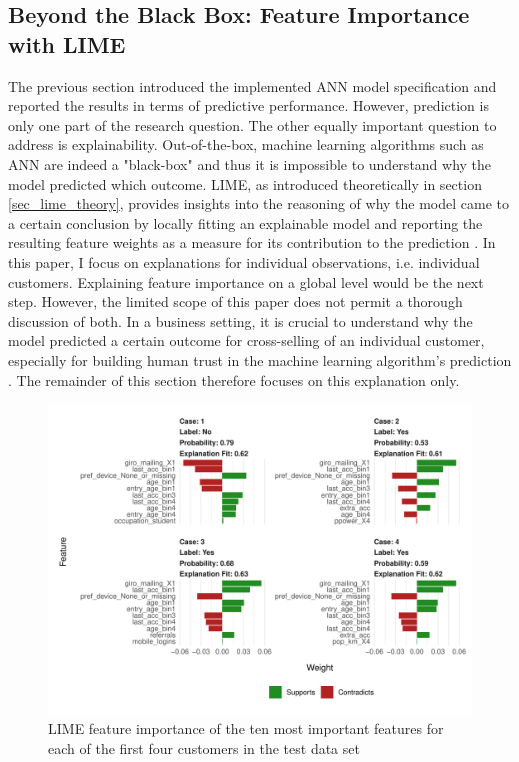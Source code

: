 \documentclass[12pt,a4paper]{article}
\begin{document}
\subsection{Beyond the Black Box: Feature Importance with LIME}
The previous section introduced the implemented ANN model specification and reported the results in terms of predictive performance.
However, prediction is only one part of the research question.
The other equally important question to address is explainability.
Out-of-the-box, machine learning algorithms such as ANN are indeed a "black-box" and thus it is impossible to understand why the model predicted which outcome.
LIME, as introduced theoretically in section \ref{sec_lime_theory}, provides insights into the reasoning of why the model came to a certain
conclusion by locally fitting an explainable model and reporting the resulting feature weights as a measure for its contribution to the prediction \citep{ribeiroWhyShouldTrust2016a}.
In this paper, I focus on explanations for individual observations, i.e. individual customers.
Explaining feature importance on a global level would be the next step.
However, the limited scope of this paper does not permit a thorough discussion of both.
In a business setting, it is crucial to understand why the model predicted a certain outcome for cross-selling of an individual customer, especially for building human trust in the machine learning algorithm's prediction \citep{ribeiroWhyShouldTrust2016a}.
The remainder of this section therefore focuses on this explanation only.

\begin{figure}[ht]
	\centering
  \includegraphics[scale=0.83]{figures/lime_first_four.pdf}
	\caption{LIME feature importance of the ten most important features for each of the first four customers in the test data set}
	\label{fig_lime_four}
\end{figure}
\end{document}
